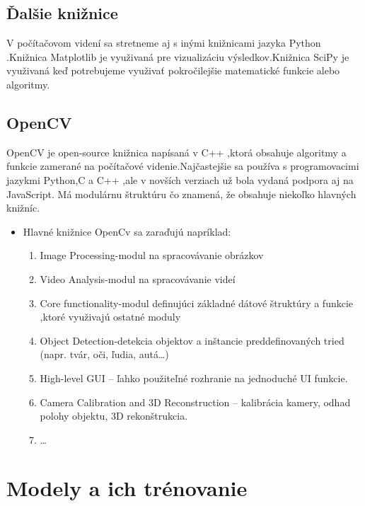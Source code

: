 \documentclass[10pt,twoside,slovak,a4paper]{coursepaper}
\begin{document}
\subsection{Ďalšie knižnice  } \label{ina:nejake}
V počítačovom videní sa stretneme aj s inými knižnicami jazyka Python .Knižnica Matplotlib je využivaná pre vizualizáciu  výsledkov.Knižnica SciPy je využivaná keď potrebujeme využivať pokročilejšie matematické funkcie alebo algoritmy.


\subsection{OpenCV} \label{ina:nejake}
OpenCV je  open-source knižnica napísaná v C++ ,ktorá obsahuje algoritmy a funkcie zamerané na počítačové videnie.Najčastejšie sa používa s programovacimi jazykmi Python,C a C++ ,ale v novších verziach už bola vydaná podpora aj na JavaScript. Má modulárnu štruktúru čo znamená, že obsahuje niekoľko hlavných knižníc.
\begin{itemize}
\item Hlavné knižnice OpenCv sa zaraďujú napríklad:
	\begin{enumerate}
	\item Image Processing-modul na spracovávanie obrázkov
	\item Video Analysis-modul na spracovávanie videí
	\item Core functionality-modul definujúci základné dátové štruktúry a funkcie ,ktoré využivajú ostatné moduly
	\item Object Detection-detekcia objektov a inštancie preddefinovaných tried (napr. tvár, oči, ľudia, autá…)
	\item High-level GUI – ľahko použiteľné rozhranie na jednoduché UI funkcie.
	\item Camera Calibration and 3D Reconstruction  – kalibrácia kamery, odhad polohy objektu, 3D rekonštrukcia.
	\item \ldots{}
\cite{Python-CV}
	\end{enumerate}
\end{itemize}

\section{Modely a ich trénovanie} \label{nejaka}
\cite{CV-Framework}
\end{document}
